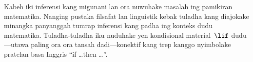 \documentclass[../../../include/open-logic-section]{subfiles}
\begin{document}
Kabeh iki inferensi kang migunani lan ora nuwuhake masalah ing
pamikiran matematika. Nanging pustaka filsafat lan linguistik kebak
tuladha kang diajokake minangka panyanggah tumrap inferensi kang
padha ing konteks dudu matematika. Tuladha-tuladha iku nuduhake yen
kondisional material~$\lif$ dudu---utawa paling ora ora tansah
dadi---konektif kang trep kanggo nyimbolake pratelan basa Inggris
``if \dots then \dots''.
\end{document}
